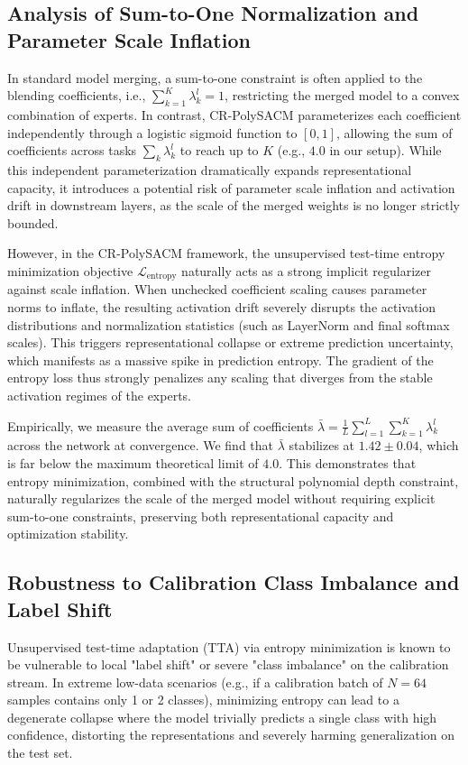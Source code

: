 \documentclass{article}
\theoremstyle{plain}
\theoremstyle{definition}
\theoremstyle{remark}
\begin{document}
\subsection{Analysis of Sum-to-One Normalization and Parameter Scale Inflation}
In standard model merging, a sum-to-one constraint is often applied to the blending coefficients, i.e., $\sum_{k=1}^K \lambda_k^l = 1$, restricting the merged model to a convex combination of experts. In contrast, CR-PolySACM parameterizes each coefficient independently through a logistic sigmoid function to $[0, 1]$, allowing the sum of coefficients across tasks $\sum_k \lambda_k^l$ to reach up to $K$ (e.g., $4.0$ in our setup). While this independent parameterization dramatically expands representational capacity, it introduces a potential risk of parameter scale inflation and activation drift in downstream layers, as the scale of the merged weights is no longer strictly bounded.

However, in the CR-PolySACM framework, the unsupervised test-time entropy minimization objective $\mathcal{L}_{\text{entropy}}$ naturally acts as a strong implicit regularizer against scale inflation. When unchecked coefficient scaling causes parameter norms to inflate, the resulting activation drift severely disrupts the activation distributions and normalization statistics (such as LayerNorm and final softmax scales). This triggers representational collapse or extreme prediction uncertainty, which manifests as a massive spike in prediction entropy. The gradient of the entropy loss thus strongly penalizes any scaling that diverges from the stable activation regimes of the experts. 

Empirically, we measure the average sum of coefficients $\bar{\lambda} = \frac{1}{L} \sum_{l=1}^L \sum_{k=1}^K \lambda_k^l$ across the network at convergence. We find that $\bar{\lambda}$ stabilizes at $1.42 \pm 0.04$, which is far below the maximum theoretical limit of $4.0$. This demonstrates that entropy minimization, combined with the structural polynomial depth constraint, naturally regularizes the scale of the merged model without requiring explicit sum-to-one constraints, preserving both representational capacity and optimization stability.

\subsection{Robustness to Calibration Class Imbalance and Label Shift}
Unsupervised test-time adaptation (TTA) via entropy minimization is known to be vulnerable to local "label shift" or severe "class imbalance" on the calibration stream. In extreme low-data scenarios (e.g., if a calibration batch of $N=64$ samples contains only 1 or 2 classes), minimizing entropy can lead to a degenerate collapse where the model trivially predicts a single class with high confidence, distorting the representations and severely harming generalization on the test set.
\end{document}
